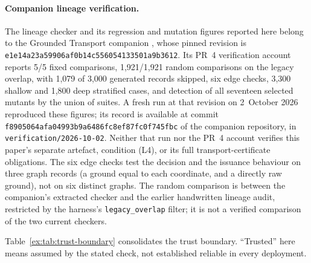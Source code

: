 \documentclass[11pt]{article}
\theoremstyle{definition}
\begin{document}
\paragraph{Companion lineage verification.}
The lineage checker and its regression and mutation figures reported
here belong to the Grounded Transport companion
\citep{moore2026transport}, whose pinned revision is
\nolinkurl{e1e14a23a59906af0b14c556054133501a9b3612}.
Its PR~4 verification account reports 5/5 fixed comparisons,
1,921/1,921 random comparisons on the legacy overlap, with
1,079 of 3,000 generated records skipped, six edge checks,
3,300 shallow and 1,800 deep stratified cases, and detection
of all seventeen selected mutants by the union of suites.
A fresh run at that revision on 2~October 2026 reproduced these
figures; its record is available at commit
\nolinkurl{f8905064afa04993b9a6486fc8ef87fc0f745fbc} of the companion
repository, in \nolinkurl{verification/2026-10-02}. Neither that run nor the PR~4 account verifies this paper's
separate artefact, condition (L4), or its full transport-certificate
obligations.
The six edge checks test the decision and the issuance behaviour on
three graph records (a ground equal to each coordinate, and a directly raw
ground), not on six distinct graphs. The random comparison is between the
companion's extracted checker and the earlier handwritten lineage audit,
restricted by the harness's \nolinkurl{legacy_overlap} filter; it is not a
verified comparison of the two current checkers.

Table~\ref{ex:tab:trust-boundary} consolidates the trust boundary. ``Trusted'' here means assumed by the stated check, not established reliable in every deployment.
\end{document}

